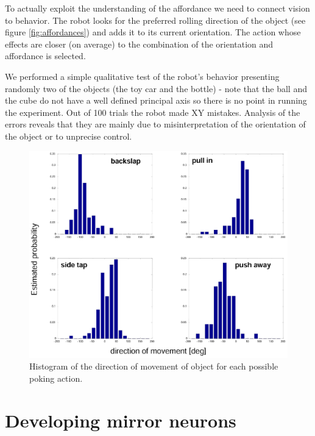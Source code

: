 To actually exploit the understanding of the affordance we need to connect vision to 
behavior. The robot looks for the preferred rolling direction of the object
(see figure \ref{fig:affordances}) and adds it to its current orientation. 
The action whose effects are closer (on average) to the combination of the orientation
and affordance is selected.

We performed a simple qualitative test of the robot's behavior presenting randomly
two of the objects (the toy car and the bottle) - note that the ball and the cube 
do not have a well defined principal axis so there is no point in running the 
experiment. Out of 100 trials the robot made XY mistakes. Analysis 
of the errors reveals that they are mainly due to misinterpretation of the 
orientation of the object or to unprecise control.

\begin{figure}[tb]
\begin{center}
\includegraphics[width=12cm]{actions.eps}
\caption{ 
\label{fig:actions}
%
Histogram of the direction of movement of object for each possible poking action.
%
}
\end{center}
\end{figure}


\section{Developing mirror neurons}

